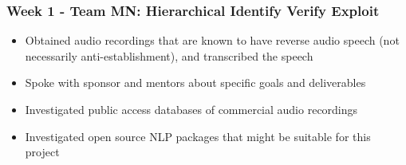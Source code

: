 
\begin{frame}
    \frametitle{\textcolor{Mahogany}{Week 1 - Team MN: Hierarchical Identify Verify Exploit}}
    \begin{itemize}
        \item Obtained audio recordings that are known to have reverse audio speech (not necessarily anti-establishment), and transcribed the speech
        \item Spoke with sponsor and mentors about specific goals and deliverables
        \item Investigated public access databases of commercial audio recordings
        \item Investigated open source NLP packages that might be suitable for this project
    \end{itemize}

    \end{frame}